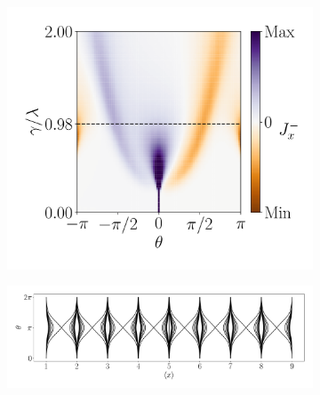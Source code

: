 \begin{figure}[h!]
\begin{minipage}[h!]{1\textwidth}
\begin{subfigure}[b!]{0.35 \textwidth}
         \end{subfigure}\hspace*{-0.5em}
         \begin{subfigure}[b!]{0.35 \textwidth}
             \caption{}
             \includegraphics[width=\textwidth]{Imagenes/Resultados_pump_Cuadrado/x/current_square_pump_negx.pdf}
         \end{subfigure}\hspace*{-0.5em}
     \end{minipage}\vspace*{-1em}
     
     
     \begin{minipage}[h!]{1\textwidth}
         \begin{subfigure}[b!]{1.0 \textwidth}
             \caption{}
             \includegraphics[width=\textwidth]{Imagenes/Resultados_pump_Cuadrado/x/wannier_centerx.pdf}
         \end{subfigure}\hspace*{-0.5em}
     \end{minipage}\vspace*{-1em}


\end{figure}
